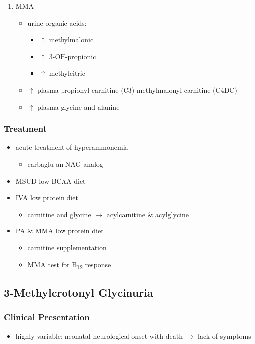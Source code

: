 \documentclass[12pt]{scrartcl}
\begin{document}
\begin{enumerate}
\item MMA
\label{sec:org943957c}
\begin{itemize}
\item urine organic acids:
\begin{itemize}
\item \(\uparrow\) methylmalonic
\item \(\uparrow\) 3-OH-propionic
\item \(\uparrow\) methylcitric
\end{itemize}
\item \(\uparrow\) plasma propionyl-carnitine (C3) \textpm{} methylmalonyl-carnitine (C4DC)
\item \(\uparrow\) plasma glycine and alanine
\end{itemize}
\end{enumerate}

\subsubsection{Treatment}
\label{sec:org4dfcbab}
\begin{itemize}
\item acute treatment of hyperammonemia
\begin{itemize}
\item carbaglu an NAG analog
\end{itemize}
\item MSUD low BCAA diet
\item IVA low protein diet
\begin{itemize}
\item carnitine and glycine \(\to\) acylcarnitine \& acylglycine
\end{itemize}
\item PA \& MMA low protein diet
\begin{itemize}
\item carnitine supplementation
\item MMA test for B\textsubscript{12} response
\end{itemize}
\end{itemize}

\subsection{3-Methylcrotonyl Glycinuria}
\label{sec:orge962ae0}
\subsubsection{Clinical Presentation}
\label{sec:org67c37a6}
\begin{itemize}
\item highly variable: neonatal neurological onset with death \(\to\) lack of symptoms
\end{itemize}
\end{document}
